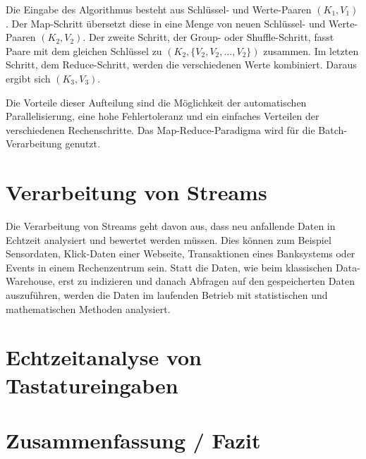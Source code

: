 \documentclass[a4paper,11pt]{scrartcl}
\begin{document}
Die Eingabe des Algorithmus besteht aus Schlüssel- und Werte-Paaren
$(K_1,V_1)$. Der Map-Schritt übersetzt diese in eine Menge von neuen Schlüssel-
und Werte-Paaren $(K_2,V_2)$. Der zweite Schritt, der Group- oder
Shuffle-Schritt, fasst Paare mit dem gleichen Schlüssel zu $(K_2,
\{V_2,V_2,\ldots,V_2\})$ zusammen. Im letzten Schritt, dem Reduce-Schritt,
werden die verschiedenen Werte kombiniert. Daraus ergibt sich $(K_3,V_3)$.

Die Vorteile dieser Aufteilung sind die Möglichkeit der automatischen
Parallelisierung, eine hohe Fehlertoleranz und ein einfaches Verteilen der
verschiedenen Rechenschritte. Das Map-Reduce-Paradigma wird für die
Batch-Verarbeitung genutzt.

\section{Verarbeitung von Streams}
Die Verarbeitung von Streams geht davon aus, dass neu anfallende Daten in
Echtzeit analysiert und bewertet werden müssen. Dies können zum Beispiel
Sensordaten, Klick-Daten einer Webseite, Transaktionen eines Banksystems oder
Events in einem Rechenzentrum sein. Statt die Daten, wie beim klassischen
Data-Warehouse, erst zu indizieren und danach Abfragen auf den gespeicherten
Daten auszuführen, werden die Daten im laufenden Betrieb mit statistischen und
mathematischen Methoden analysiert.





\section{Echtzeitanalyse von Tastatureingaben}

\section{Zusammenfassung / Fazit}
\end{document}
